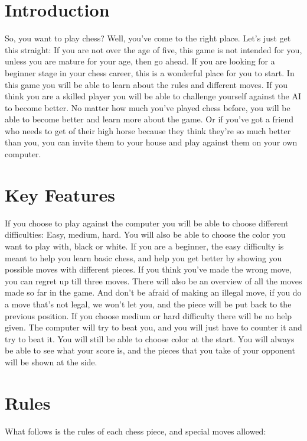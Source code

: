 \documentclass{article}
\begin{document}
\maketitle

\section*{Introduction}
So, you want to play chess? Well, you’ve come to the right place. Let’s just get this straight: If you are not over the age of five, this game is not intended for you, unless you are mature for your age, then go ahead. 
If you are looking for a beginner stage in your chess career, this is a wonderful place for you to start. In this game you will be able to learn about the rules and different moves. If you think you are a skilled player you will be able to challenge yourself against the AI to become better. No matter how much you’ve played chess before, you will be able to become better and learn more about the game. Or if you’ve got a friend who needs to get of their high horse because they think they’re so much better than you, you can invite them to your house and play against them on your own computer.


\section*{Key Features}
If you choose to play against the computer you will be able to choose different difficulties: Easy, medium, hard. You will also be able to choose the color you want to play with, black or white. If you are a beginner, the easy difficulty is meant to help you learn basic chess, and help you get better by showing you possible moves with different pieces. If you think you’ve made the wrong move, you can regret up till three moves. There will also be an overview of all the moves made so far in the game. And don’t be afraid of making an illegal move, if you do a move that’s not legal, we won’t let you, and the piece will be put back to the previous position.  
If you choose medium or hard difficulty there will be no help given. The computer will try to beat you, and you will just have to counter it and try to beat it. You will still be able to choose color at the start. 
You will always be able to see what your score is, and the pieces that you take of your opponent will be shown at the side. 

\newpage
\section*{Rules}
What follows is the rules of each chess piece, and special moves allowed:
\end{document}
